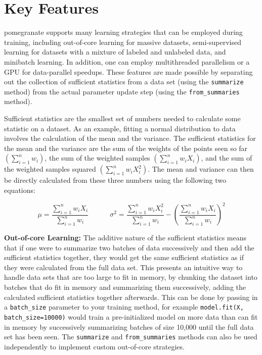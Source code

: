 \documentclass{article}
\newcommand{\code}[1]{\colorbox{light-gray}{\texttt{#1}}}
\begin{document}
\section{Key Features}

pomegranate supports many learning strategies that can be employed during training, including out-of-core learning for massive datasets, semi-supervised learning for datasets with a mixture of labeled and unlabeled data, and minibatch learning. In addition, one can employ multithreaded parallelism or a GPU for data-parallel speedups. These features are made possible by separating out the collection of sufficient statistics from a data set (using the \code{summarize} method) from the actual parameter update step (using the \code{from\_summaries} method).

Sufficient statistics are the smallest set of numbers needed to calculate some statistic on a dataset. As an example, fitting a normal distribution to data involves the calculation of the mean and the variance. The sufficient statistics for the mean and the variance are the sum of the weights of the points seen so far $\left( \sum\limits_{i=1}^{n}w_{i} \right)$, the sum of the weighted samples $\left( \sum\limits_{i=1}^{n}w_{i}X_{i} \right)$, and the sum of the weighted samples squared $\left( \sum\limits_{i=1}^{n}w_{i}X_{i}^{2} \right)$. The mean and variance can then be directly calculated from these three numbers using the following two equations:

\begin{equation}
\mu = \frac{\sum\limits_{i=1}^{n}w_{i}X_{i}}{\sum\limits_{i=1}^{n} w_{i}} \quad\quad\quad \sigma^{2} = \frac{\sum\limits_{i=1}^{n}w_{i}X_{i}^{2}}{\sum\limits_{i=1}^{n}w_{i}} - \left( \frac{\sum\limits_{i=1}^{n}w_{i}X_{i}}{\sum\limits_{i=1}^{n}w_{i}} \right)^{2}
\end{equation}

\vspace{1em}\noindent\textbf{Out-of-core Learning:} The additive nature of the sufficient statistics means that if one were to summarize two batches of data successively and then add the sufficient statistics together, they would get the same sufficient statistics as if they were calculated from the full data set. This presents an intuitive way to handle data sets that are too large to fit in memory, by chunking the dataset into batches that do fit in memory and summarizing them successively, adding the calculated sufficient statistics together afterwards. This can be done by passing in a \code{batch\_size} parameter to your training method, for example \code{model.fit(X, batch\_size=10000)} would train a pre-initialized model on more data than can fit in memory by successively summarizing batches of size 10,000 until the full data set has been seen. The \code{summarize} and \code{from\_summaries} methods can also be used independently to implement custom out-of-core strategies.  
\end{document}
